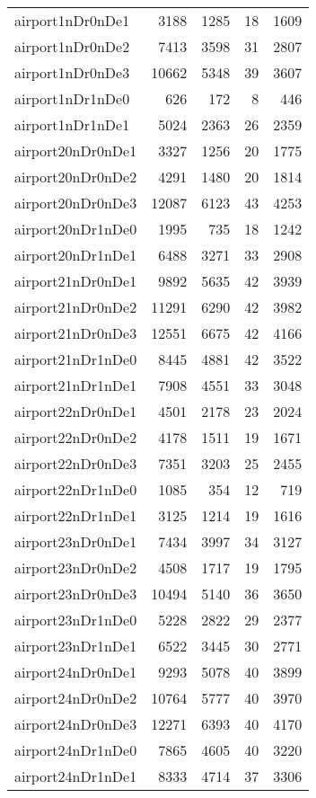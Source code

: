 \documentclass[../../../thesis.tex]{subfiles}
\begin{document}
\begin{longtable}{lrrrr}
airport1nDr0nDe1 & 3188 & 1285 & 18 & 1609 \\
airport1nDr0nDe2 & 7413 & 3598 & 31 & 2807 \\
airport1nDr0nDe3 & 10662 & 5348 & 39 & 3607 \\
airport1nDr1nDe0 & 626 & 172 & 8 & 446 \\
airport1nDr1nDe1 & 5024 & 2363 & 26 & 2359 \\
airport20nDr0nDe1 & 3327 & 1256 & 20 & 1775 \\
airport20nDr0nDe2 & 4291 & 1480 & 20 & 1814 \\
airport20nDr0nDe3 & 12087 & 6123 & 43 & 4253 \\
airport20nDr1nDe0 & 1995 & 735 & 18 & 1242 \\
airport20nDr1nDe1 & 6488 & 3271 & 33 & 2908 \\
airport21nDr0nDe1 & 9892 & 5635 & 42 & 3939 \\
airport21nDr0nDe2 & 11291 & 6290 & 42 & 3982 \\
airport21nDr0nDe3 & 12551 & 6675 & 42 & 4166 \\
airport21nDr1nDe0 & 8445 & 4881 & 42 & 3522 \\
airport21nDr1nDe1 & 7908 & 4551 & 33 & 3048 \\
airport22nDr0nDe1 & 4501 & 2178 & 23 & 2024 \\
airport22nDr0nDe2 & 4178 & 1511 & 19 & 1671 \\
airport22nDr0nDe3 & 7351 & 3203 & 25 & 2455 \\
airport22nDr1nDe0 & 1085 & 354 & 12 & 719 \\
airport22nDr1nDe1 & 3125 & 1214 & 19 & 1616 \\
airport23nDr0nDe1 & 7434 & 3997 & 34 & 3127 \\
airport23nDr0nDe2 & 4508 & 1717 & 19 & 1795 \\
airport23nDr0nDe3 & 10494 & 5140 & 36 & 3650 \\
airport23nDr1nDe0 & 5228 & 2822 & 29 & 2377 \\
airport23nDr1nDe1 & 6522 & 3445 & 30 & 2771 \\
airport24nDr0nDe1 & 9293 & 5078 & 40 & 3899 \\
airport24nDr0nDe2 & 10764 & 5777 & 40 & 3970 \\
airport24nDr0nDe3 & 12271 & 6393 & 40 & 4170 \\
airport24nDr1nDe0 & 7865 & 4605 & 40 & 3220 \\
airport24nDr1nDe1 & 8333 & 4714 & 37 & 3306 \\

\end{longtable}
\end{document}
